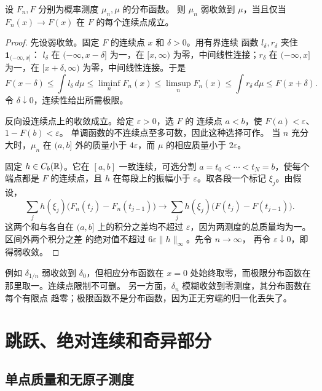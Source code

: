 \begin{theorem}\label{thm:stieltjes-cdf-weak}
设 \(F_n,F\) 分别为概率测度 \(\mu_n,\mu\) 的分布函数。
则 \(\mu_n\) 弱收敛到 \(\mu\)，当且仅当
\(F_n(x)\to F(x)\) 在 \(F\) 的每个连续点成立。
\end{theorem}
\begin{proof}
先设弱收敛。固定 \(F\) 的连续点 \(x\) 和 \(\delta>0\)。用有界连续
函数 \(l_\delta,r_\delta\) 夹住 \(\mathbf1_{(-\infty,x]}\)：
\(l_\delta\) 在 \(({-\infty},x-\delta]\) 为一，在 \([x,\infty)\)
为零，中间线性连接；\(r_\delta\) 在 \(({-\infty},x]\) 为一，在
\([x+\delta,\infty)\) 为零，中间线性连接。于是
\[
 F(x-\delta)\le\int l_\delta\,d\mu
 \le\liminf_n F_n(x)\le\limsup_n F_n(x)
 \le\int r_\delta\,d\mu\le F(x+\delta).
\]
令 \(\delta\downarrow0\)，连续性给出所需极限。

反向设连续点上的收敛成立。给定 \(\varepsilon>0\)，选 \(F\) 的
连续点 \(a<b\)，使 \(F(a)<\varepsilon\)、\(1-F(b)<\varepsilon\)。
单调函数的不连续点至多可数，因此这种选择可作。
当 \(n\) 充分大时，\(\mu_n\) 在 \((a,b]\) 外的质量小于
\(4\varepsilon\)，而 \(\mu\) 的相应质量小于 \(2\varepsilon\)。

固定 \(h\in C_b(\mathbb{R})\)。它在 \([a,b]\) 一致连续，可选分割
\(a=t_0<\cdots<t_N=b\)，使每个端点都是 \(F\) 的连续点，且
\(h\) 在每段上的振幅小于 \(\varepsilon\)。取各段一个标记
\(\xi_j\)。由假设，
\[
 \sum_j h(\xi_j)\bigl(F_n(t_j)-F_n(t_{j-1})\bigr)
 \longrightarrow
 \sum_j h(\xi_j)\bigl(F(t_j)-F(t_{j-1})\bigr).
\]
这两个和与各自在 \((a,b]\) 上的积分之差均不超过
\(\varepsilon\)，因为两测度的总质量均为一。区间外两个积分之差
的绝对值不超过 \(6\varepsilon\|h\|_\infty\)。先令 \(n\to\infty\)，
再令 \(\varepsilon\downarrow0\)，即得弱收敛。
\end{proof}

例如 \(\delta_{1/n}\) 弱收敛到 \(\delta_0\)，但相应分布函数在
\(x=0\) 处始终取零，而极限分布函数在那里取一。连续点限制不可删。
另一方面，\(\delta_n\) 模糊收敛到零测度，其分布函数在每个有限点
趋零；极限函数不是分布函数，因为正无穷端的归一化丢失了。

\section{跳跃、绝对连续和奇异部分}
\label{sec:stieltjes-three-components}

\subsection{单点质量和无原子测度}

